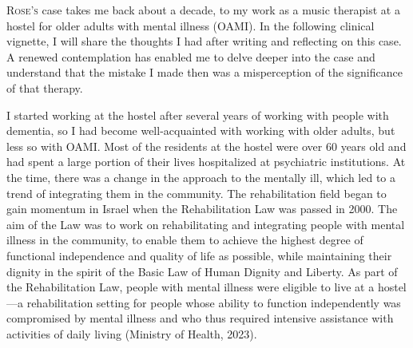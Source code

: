 \documentclass[authordate, empirical, issue]{jote-new-article}
\author[1]{\mbox{Ayelet Dassa\orcid{0000-0001-7641-3918}}}
\affil[1]{Bar-Ilan University}
\begin{document}
\begin{frontmatter}
  \maketitle
  \begin{abstract}
    \printabstracttext
  \end{abstract}
\end{frontmatter}

\setcounter{page}{36}

\lettrine{R}{ose's} case takes me back about a decade, to my work as a music therapist at a hostel for older adults with mental illness (OAMI). In the following clinical vignette, I will share the thoughts I had after writing and reflecting on this case. A renewed contemplation has enabled me to delve deeper into the case and understand that the mistake I made then was a misperception of the significance of that therapy.

I started working at the hostel after several years of working with people with dementia, so I had become well-acquainted with working with older adults, but less so with OAMI. Most of the residents at the hostel were over 60 years old and had spent a large portion of their lives hospitalized at psychiatric institutions. At the time, there was a change in the approach to the mentally ill, which led to a trend of integrating them in the community. The rehabilitation field began to gain momentum in Israel when the Rehabilitation Law was passed in 2000. The aim of the Law was to work on rehabilitating and integrating people with mental illness in the community, to enable them to achieve the highest degree of functional independence and quality of life as possible, while maintaining their dignity in the spirit of the Basic Law of Human Dignity and Liberty. As part of the Rehabilitation Law, people with mental illness were eligible to live at a hostel—a rehabilitation setting for people whose ability to function independently was compromised by mental illness and who thus required intensive assistance with activities of daily living (Ministry of Health, 2023).
\end{document}
